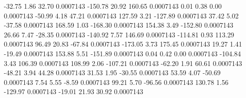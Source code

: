       -32.75        1.86       32.70     0.0007143
     -150.78       20.92      160.65     0.0007143
        0.01        0.38        0.00     0.0007143
      -50.99        4.18       47.21     0.0007143
      127.59        3.21     -127.89     0.0007143
       37.42        5.02      -37.58     0.0007143
      168.59        1.03     -168.30     0.0007143
      154.38        3.49     -152.80     0.0007143
       26.66        7.47      -28.35     0.0007143
     -140.92        7.57      146.69     0.0007143
     -114.81        0.93      113.29     0.0007143
       96.49       20.83      -67.84     0.0007143
     -173.05        3.73      175.45     0.0007143
       19.27        1.41      -19.49     0.0007143
      153.88        5.51     -151.89     0.0007143
        0.04        0.42        0.00     0.0007143
     -104.84        3.43      106.39     0.0007143
      108.99        2.06     -107.21     0.0007143
      -62.20        1.91       60.61     0.0007143
      -48.21        3.94       44.28     0.0007143
       31.53        1.95      -30.55     0.0007143
       53.59        4.07      -50.69     0.0007143
        7.54        5.55       -8.59     0.0007143
       99.21        5.70      -96.56     0.0007143
      130.78        1.56     -129.97     0.0007143
      -19.01       21.93       30.92     0.0007143
